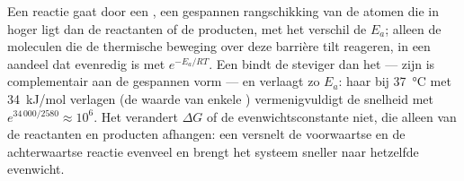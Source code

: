 \begin{proposition}\label{prop:b1:enzymes:whatitdoes}
Een reactie gaat door een \emph{}, een gespannen rangschikking
van de atomen die in  hoger ligt dan de reactanten of de producten,
met het verschil de \emph{} $E_a$; alleen de moleculen die de
thermische beweging over deze barrière tilt reageren, in een aandeel dat evenredig
is met $e^{-E_a/RT}$. Een  bindt de  steviger dan het
 --- zijn  is complementair aan de gespannen vorm --- en
verlaagt zo $E_a$: haar bij \qty{37}{\celsius} met \qty{34}{kJ/mol} verlagen (de
waarde van enkele ) vermenigvuldigt de snelheid met
$e^{34\,000/2580} \approx
10^6$. Het verandert $\Delta G$ of de evenwichtsconstante niet, die alleen van de
reactanten en producten afhangen: een  versnelt de voorwaartse en de
achterwaartse reactie evenveel en brengt het systeem sneller naar hetzelfde
evenwicht.
\end{proposition}

